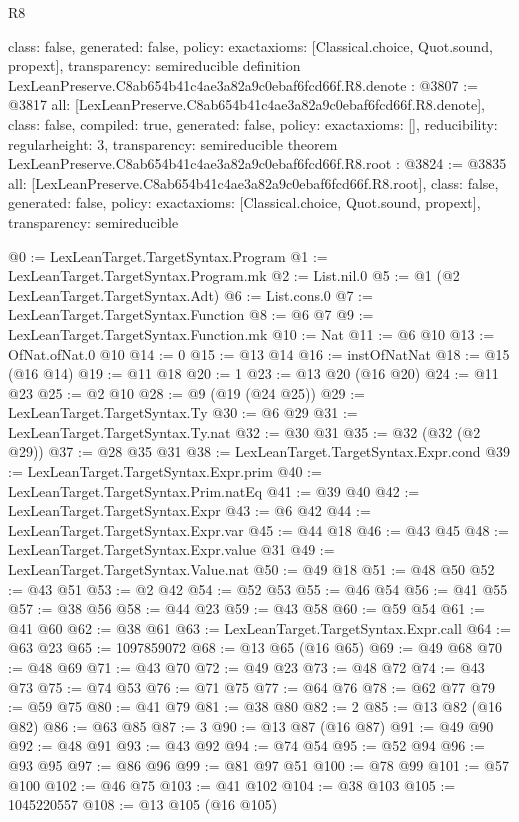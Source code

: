 \begin{lexlean}{R8}
\begin{coremodule}
{  class: false,
  generated: false,
  policy: exact{axioms: [Classical.choice, Quot.sound, propext]},
  transparency: semireducible
}
definition LexLeanPreserve.C8ab654b41c4ae3a82a9c0ebaf6fcd66f.R8.denote : @3807 := @3817 {
  all: [LexLeanPreserve.C8ab654b41c4ae3a82a9c0ebaf6fcd66f.R8.denote],
  class: false,
  compiled: true,
  generated: false,
  policy: exact{axioms: []},
  reducibility: regular{height: 3},
  transparency: semireducible
}
theorem LexLeanPreserve.C8ab654b41c4ae3a82a9c0ebaf6fcd66f.R8.root : @3824 := @3835 {
  all: [LexLeanPreserve.C8ab654b41c4ae3a82a9c0ebaf6fcd66f.R8.root],
  class: false,
  generated: false,
  policy: exact{axioms: [Classical.choice, Quot.sound, propext]},
  transparency: semireducible
}

@0 := LexLeanTarget.TargetSyntax.Program
@1 := LexLeanTarget.TargetSyntax.Program.mk
@2 := List.nil.{0}
@5 := @1 (@2 LexLeanTarget.TargetSyntax.Adt)
@6 := List.cons.{0}
@7 := LexLeanTarget.TargetSyntax.Function
@8 := @6 @7
@9 := LexLeanTarget.TargetSyntax.Function.mk
@10 := Nat
@11 := @6 @10
@13 := OfNat.ofNat.{0} @10
@14 := 0
@15 := @13 @14
@16 := instOfNatNat
@18 := @15 (@16 @14)
@19 := @11 @18
@20 := 1
@23 := @13 @20 (@16 @20)
@24 := @11 @23
@25 := @2 @10
@28 := @9 (@19 (@24 @25))
@29 := LexLeanTarget.TargetSyntax.Ty
@30 := @6 @29
@31 := LexLeanTarget.TargetSyntax.Ty.nat
@32 := @30 @31
@35 := @32 (@32 (@2 @29))
@37 := @28 @35 @31
@38 := LexLeanTarget.TargetSyntax.Expr.cond
@39 := LexLeanTarget.TargetSyntax.Expr.prim
@40 := LexLeanTarget.TargetSyntax.Prim.natEq
@41 := @39 @40
@42 := LexLeanTarget.TargetSyntax.Expr
@43 := @6 @42
@44 := LexLeanTarget.TargetSyntax.Expr.var
@45 := @44 @18
@46 := @43 @45
@48 := LexLeanTarget.TargetSyntax.Expr.value @31
@49 := LexLeanTarget.TargetSyntax.Value.nat
@50 := @49 @18
@51 := @48 @50
@52 := @43 @51
@53 := @2 @42
@54 := @52 @53
@55 := @46 @54
@56 := @41 @55
@57 := @38 @56
@58 := @44 @23
@59 := @43 @58
@60 := @59 @54
@61 := @41 @60
@62 := @38 @61
@63 := LexLeanTarget.TargetSyntax.Expr.call
@64 := @63 @23
@65 := 1097859072
@68 := @13 @65 (@16 @65)
@69 := @49 @68
@70 := @48 @69
@71 := @43 @70
@72 := @49 @23
@73 := @48 @72
@74 := @43 @73
@75 := @74 @53
@76 := @71 @75
@77 := @64 @76
@78 := @62 @77
@79 := @59 @75
@80 := @41 @79
@81 := @38 @80
@82 := 2
@85 := @13 @82 (@16 @82)
@86 := @63 @85
@87 := 3
@90 := @13 @87 (@16 @87)
@91 := @49 @90
@92 := @48 @91
@93 := @43 @92
@94 := @74 @54
@95 := @52 @94
@96 := @93 @95
@97 := @86 @96
@99 := @81 @97 @51
@100 := @78 @99
@101 := @57 @100
@102 := @46 @75
@103 := @41 @102
@104 := @38 @103
@105 := 1045220557
@108 := @13 @105 (@16 @105)

\end{coremodule}
\end{lexlean}
